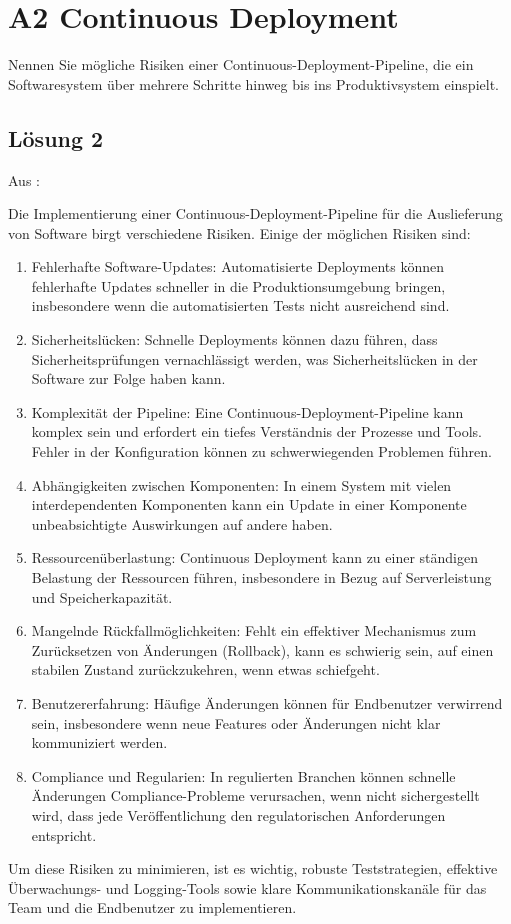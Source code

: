 \documentclass[main.tex]{subfiles}
\begin{document}
\section{A2 Continuous Deployment}
Nennen Sie mögliche Risiken einer Continuous-Deployment-Pipeline, die ein Softwaresystem
über mehrere Schritte hinweg bis ins Produktivsystem einspielt.

\subsection{Lösung 2}
Aus \cite{openai2023chatgpt4}:


Die Implementierung einer Continuous-Deployment-Pipeline für die Auslieferung von Software birgt verschiedene Risiken. Einige der möglichen Risiken sind:

\renewcommand{\labelenumi}{\arabic{enumi}.}
\begin{enumerate}
\item Fehlerhafte Software-Updates: Automatisierte Deployments können fehlerhafte Updates schneller in die Produktionsumgebung bringen, insbesondere wenn die automatisierten Tests nicht ausreichend sind.
\item Sicherheitslücken: Schnelle Deployments können dazu führen, dass Sicherheitsprüfungen vernachlässigt werden, was Sicherheitslücken in der Software zur Folge haben kann.
\item Komplexität der Pipeline: Eine Continuous-Deployment-Pipeline kann komplex sein und erfordert ein tiefes Verständnis der Prozesse und Tools. Fehler in der Konfiguration können zu schwerwiegenden Problemen führen.
\item Abhängigkeiten zwischen Komponenten: In einem System mit vielen interdependenten Komponenten kann ein Update in einer Komponente unbeabsichtigte Auswirkungen auf andere haben.
\item Ressourcenüberlastung: Continuous Deployment kann zu einer ständigen Belastung der Ressourcen führen, insbesondere in Bezug auf Serverleistung und Speicherkapazität.
\item Mangelnde Rückfallmöglichkeiten: Fehlt ein effektiver Mechanismus zum Zurücksetzen von Änderungen (Rollback), kann es schwierig sein, auf einen stabilen Zustand zurückzukehren, wenn etwas schiefgeht.
\item Benutzererfahrung: Häufige Änderungen können für Endbenutzer verwirrend sein, insbesondere wenn neue Features oder Änderungen nicht klar kommuniziert werden.
\item Compliance und Regularien: In regulierten Branchen können schnelle Änderungen Compliance-Probleme verursachen, wenn nicht sichergestellt wird, dass jede Veröffentlichung den regulatorischen Anforderungen entspricht.
\end{enumerate}

Um diese Risiken zu minimieren, ist es wichtig, robuste Teststrategien, effektive Überwachungs- und Logging-Tools sowie klare Kommunikationskanäle für das Team und die Endbenutzer zu implementieren.
\end{document}
